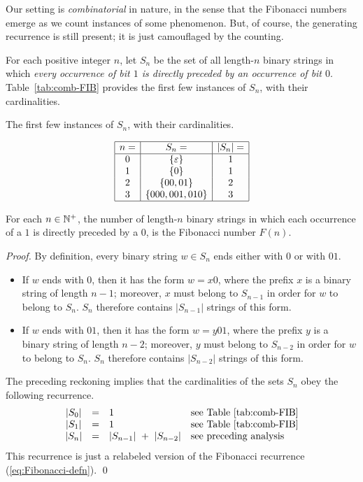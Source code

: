 \medskip

Our setting is {\em combinatorial} in nature, in the sense that the Fibonacci numbers emerge as we count instances of some phenomenon. But, of course, the generating recurrence is still present; it is just camouflaged by the counting.

\bigskip

For each positive integer $n$, let $S_n$ be the set of all length-$n$ binary strings in which {\em every occurrence of bit $1$ is directly preceded by an occurrence of bit $0$}.  Table~\ref{tab:comb-FIB} provides the first few instances of $S_n$, with their cardinalities.
\begin{table}[hbt]
\label{tab:comb-FIB}
\caption{The first few instances of $S_n$, with their cardinalities.}
\[
\begin{array}{|c|c|c|}
\hline
n = & S_n =               & |S_n| = \\
\hline
0   & \{ \varepsilon\}    & 1 \\ 
1   & \{ 0 \}             & 1 \\
2   & \{ 00, 01 \}        & 2 \\
3   & \{ 000, 001, 010 \} & 3 \\
\hline
\end{array}
\]
\end{table}


\begin{prop}
\label{thm:FIBO-from-sparse-bitstrings}
For each $n \in \mathbb{N}^+$, the number of length-$n$ binary strings in which each occurrence of a $1$ is directly preceded by a $0$, is the Fibonacci number $F(n)$.
\end{prop}

\begin{proof}
By definition, every binary string $w \in S_n$ ends either with $0$ or with $01$.
\begin{itemize}
\item
If $w$ ends with $0$, then it has the form $w = x0$, where the prefix $x$ is a binary string of length $n-1$; moreover, $x$ must belong to $S_{n-1}$ in order for $w$ to belong to $S_n$.  $S_n$ therefore contains $|S_{n-1}|$ strings of this form.

\medskip\item
If $w$ ends with $01$, then it has the form $w = y01$, where the prefix $y$ is a binary string of length $n-2$; moreover, $y$ must belong to $S_{n-2}$ in order for $w$ to belong to $S_n$.  $S_n$ therefore contains $|S_{n-2}|$ strings of this form.
\end{itemize}

The preceding reckoning implies that the cardinalities of the sets $S_n$ obey the following recurrence.
\[
\begin{array}{ccll}
|S_0| & = & 1 & \mbox{see Table~\ref{tab:comb-FIB}} \\
|S_1| & = & 1 & \mbox{see Table~\ref{tab:comb-FIB}} \\
|S_n| & = & |S_{n-1}| \ + \ |S_{n-2}| & \mbox{see preceding analysis}
\end{array}
\]
This recurrence is just a relabeled version of the Fibonacci recurrence (\ref{eq:Fibonacci-defn}).  \qed
\end{proof}



